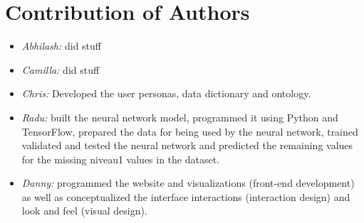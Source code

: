 \section{Contribution of Authors}

\begin{itemize}
\item \textit{Abhilash:} did stuff
\item \textit{Camilla:} did stuff
\item \textit{Chris:} Developed the user personas, data dictionary and ontology.
\item \textit{Radu:} built the neural network model, programmed it using Python and TensorFlow, prepared the data for being used by the neural network, trained validated and tested the neural network and predicted the remaining values for the missing niveau1 values in the dataset.
\item \textit{Danny:} programmed the website and visualizations (front-end development) as well as conceptualized the interface interactions (interaction design) and look and feel (visual design).
\end{itemize}